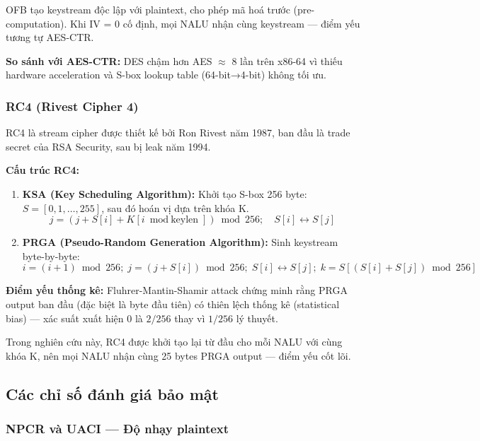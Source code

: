 OFB tạo keystream độc lập với plaintext, cho phép mã hoá trước (pre-computation).
Khi IV = 0 cố định, mọi NALU nhận cùng keystream --- điểm yếu tương tự AES-CTR.

\textbf{So sánh với AES-CTR:} DES chậm hơn AES $\approx$ 8 lần trên x86-64 vì
thiếu hardware acceleration và S-box lookup table (64-bit→4-bit) không tối ưu.

\subsubsection{RC4 (Rivest Cipher 4)}

RC4 \cite{rc4} là stream cipher được thiết kế bởi Ron Rivest năm 1987, ban đầu
là trade secret của RSA Security, sau bị leak năm 1994.

\textbf{Cấu trúc RC4:}
\begin{enumerate}
  \item \textbf{KSA (Key Scheduling Algorithm):} Khởi tạo S-box 256 byte:
        $S = [0, 1, \ldots, 255]$, sau đó hoán vị dựa trên khóa K.
        \begin{equation}
        j = (j + S[i] + K[i \bmod \text{keylen}]) \bmod 256; \quad S[i] \leftrightarrow S[j]
        \end{equation}

  \item \textbf{PRGA (Pseudo-Random Generation Algorithm):} Sinh keystream byte-by-byte:
        \begin{equation}
        i = (i+1)\bmod 256;\; j = (j+S[i])\bmod 256;\; S[i]\leftrightarrow S[j];\; k = S[(S[i]+S[j])\bmod 256]
        \end{equation}
\end{enumerate}

\textbf{Điểm yếu thống kê:} Fluhrer-Mantin-Shamir attack \cite{fms_rc4} chứng minh
rằng PRGA output ban đầu (đặc biệt là byte đầu tiên) có thiên lệch thống kê
(statistical bias) --- xác suất xuất hiện 0 là $2/256$ thay vì $1/256$ lý thuyết.

Trong nghiên cứu này, RC4 được khởi tạo lại từ đầu cho mỗi NALU với cùng khóa K,
nên mọi NALU nhận cùng 25 bytes PRGA output --- điểm yếu cốt lõi.

\subsection{Các chỉ số đánh giá bảo mật}

\subsubsection{NPCR và UACI --- Độ nhạy plaintext}

